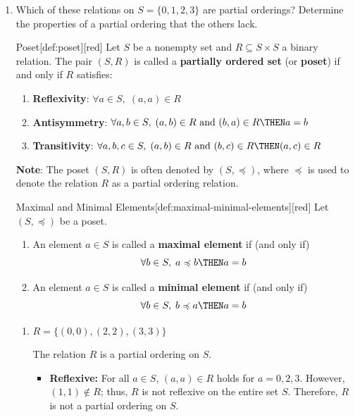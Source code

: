 \begin{enumerate}
  
  \item Which of these relations on $S=\{0,1,2,3\}$ are partial orderings? Determine the 
  properties of a partial ordering that the others lack.
  \begin{define}{Poset}[def:poset][red]
    Let $S$ be a nonempty set and $R \subseteq S \times S$ a binary relation.
    The pair $(S, R)$ is called a \textbf{partially ordered set} 
    (or \textbf{poset}) if and only if $R$ satisfies:
    \begin{enumerate}
      \item \textbf{Reflexivity}: 
      $\forall a \in S,\; (a, a) \in R$
      \item \textbf{Antisymmetry}: 
      $\forall a, b \in S,\; (a, b) \in R \text{ and } (b, a) \in R \THEN a = b$
      \item \textbf{Transitivity}: 
      $\forall a, b, c \in S,\; (a, b) \in R \text{ and } (b, c) \in R \THEN (a, c) \in R$
    \end{enumerate}
    \textbf{Note}: The poset $(S, R)$ is often denoted by $(S, \preccurlyeq)$, 
    where $\preccurlyeq$ is used to denote the relation $R$ as a partial ordering relation.
  \end{define}
  \begin{define}{Maximal and Minimal Elements}[def:maximal-minimal-elements][red]
    Let $(S, \preccurlyeq)$ be a poset. 
    \begin{enumerate}
      \item An element $a \in S$ is called a \textbf{maximal element} if (and only if) 
      $$\forall b \in S,\; a \preccurlyeq b \THEN a = b$$
      \item An element $a \in S$ is called a \textbf{minimal element} if (and only if) 
      $$\forall b \in S,\; b \preccurlyeq a \THEN a = b$$
    \end{enumerate}
  \end{define}
  \begin{enumerate}
    \item $R=\{(0,0),(2,2),(3,3)\}$
    \begin{subanswer}
      The relation $R$ is a partial ordering on $S$.
      \begin{itemize}
        \item \textbf{Reflexive:} For all $a \in S$, $(a,a) \in R$ holds for $a = 0, 2, 3$. 
        However, $(1,1) \notin R$; thus, $R$ is not reflexive on the entire set $S$.
        Therefore, $R$ is not a partial ordering on $S$.

\end{itemize}
\end{subanswer}
\end{enumerate}
\end{enumerate}
